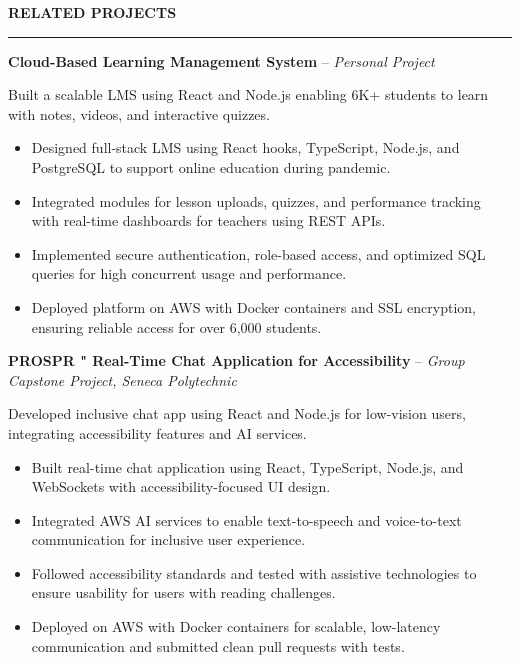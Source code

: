 \documentclass[10pt,letterpaper]{article}
\begin{document}
\vspace{6pt}

\textbf{RELATED PROJECTS}\\[-8pt]
\noindent\rule{\textwidth}{1pt}

\vspace{-2pt}

\textbf{Cloud-Based Learning Management System} -- \emph{Personal Project}

\vspace{-1pt}

Built a scalable LMS using React and Node.js enabling 6K+ students to learn with notes, videos, and interactive quizzes.
\vspace{-1pt}
\begin{itemize}
\item Designed full-stack LMS using React hooks, TypeScript, Node.js, and PostgreSQL to support online education during pandemic.
\item Integrated modules for lesson uploads, quizzes, and performance tracking with real-time dashboards for teachers using REST APIs.
\item Implemented secure authentication, role-based access, and optimized SQL queries for high concurrent usage and performance.
\item Deployed platform on AWS with Docker containers and SSL encryption, ensuring reliable access for over 6,000 students.
\end{itemize}

\textbf{PROSPR " Real-Time Chat Application for Accessibility} -- \emph{Group Capstone Project, Seneca Polytechnic}

\vspace{-1pt}

Developed inclusive chat app using React and Node.js for low-vision users, integrating accessibility features and AI services.
\vspace{-1pt}
\begin{itemize}
\item Built real-time chat application using React, TypeScript, Node.js, and WebSockets with accessibility-focused UI design.
\item Integrated AWS AI services to enable text-to-speech and voice-to-text communication for inclusive user experience.
\item Followed accessibility standards and tested with assistive technologies to ensure usability for users with reading challenges.
\item Deployed on AWS with Docker containers for scalable, low-latency communication and submitted clean pull requests with tests.
\end{itemize}
\end{document}
